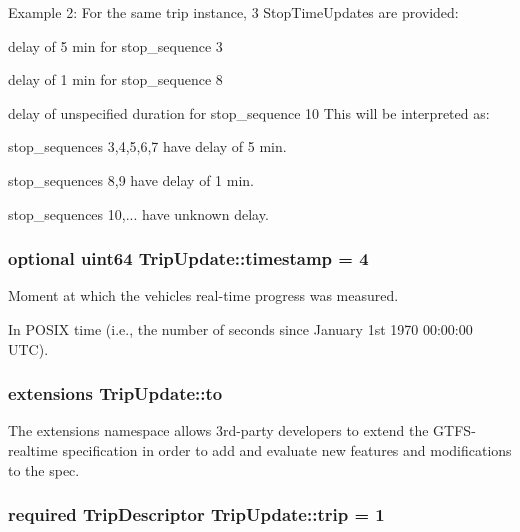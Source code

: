 Example 2\+: For the same trip instance, 3 Stop\+Time\+Updates are provided\+:
\begin{DoxyItemize}
\item delay of 5 min for stop\+\_\+sequence 3
\item delay of 1 min for stop\+\_\+sequence 8
\item delay of unspecified duration for stop\+\_\+sequence 10 This will be interpreted as\+:
\item stop\+\_\+sequences 3,4,5,6,7 have delay of 5 min.
\item stop\+\_\+sequences 8,9 have delay of 1 min.
\item stop\+\_\+sequences 10,... have unknown delay. 
\end{DoxyItemize}
\subsubsection[{\texorpdfstring{timestamp}{timestamp}}]{\setlength{\rightskip}{0pt plus 5cm}optional uint64 Trip\+Update\+::timestamp = 4}\hypertarget{structTripUpdate_a9c5a10025b4a68a78c3c0f0579186ea4}{}\label{structTripUpdate_a9c5a10025b4a68a78c3c0f0579186ea4}


Moment at which the vehicle\textquotesingle{}s real-\/time progress was measured. 

In P\+O\+S\+IX time (i.\+e., the number of seconds since January 1st 1970 00\+:00\+:00 U\+TC). 
\subsubsection[{\texorpdfstring{to}{to}}]{\setlength{\rightskip}{0pt plus 5cm}extensions Trip\+Update\+::to}\hypertarget{structTripUpdate_a08a29e188c045d0e7c8030e093883f85}{}\label{structTripUpdate_a08a29e188c045d0e7c8030e093883f85}


The extensions namespace allows 3rd-\/party developers to extend the G\+T\+F\+S-\/realtime specification in order to add and evaluate new features and modifications to the spec. 

\subsubsection[{\texorpdfstring{trip}{trip}}]{\setlength{\rightskip}{0pt plus 5cm}required {\bf Trip\+Descriptor} Trip\+Update\+::trip = 1}\hypertarget{structTripUpdate_a4589512fcd9e14cae56c57a77f4b76fb}{}\label{structTripUpdate_a4589512fcd9e14cae56c57a77f4b76fb}


